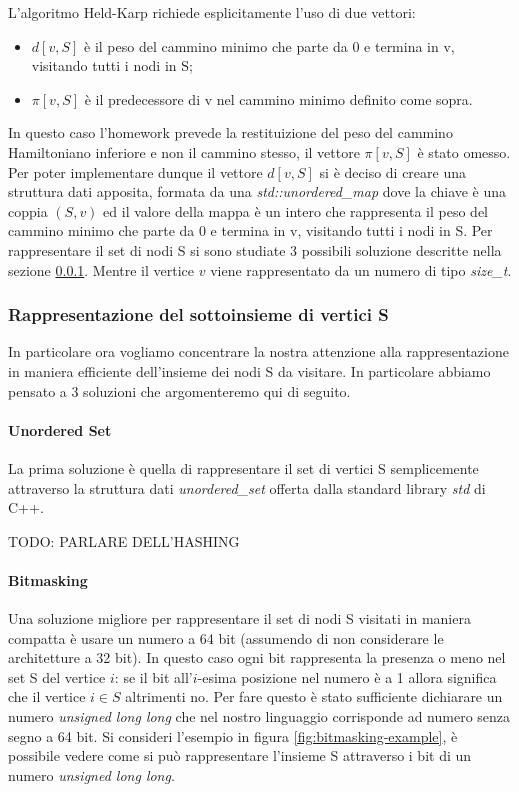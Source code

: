 L'algoritmo Held-Karp richiede esplicitamente l'uso di due vettori:
\begin{itemize}
    \item $d[v,S]$ è il peso del cammino minimo che parte da 0 e termina in v, visitando tutti i nodi in S;
    \item $\pi[v,S]$ è il predecessore di v nel cammino minimo definito come sopra.
\end{itemize}

In questo caso l'homework prevede la restituizione del peso del cammino Hamiltoniano inferiore e non il cammino stesso, il vettore $\pi[v,S]$ è stato omesso. Per poter implementare dunque il vettore $d[v,S]$ si è deciso di creare una struttura dati apposita, formata da una \textit{std::unordered\_map} dove la chiave è una coppia $(S, v)$ ed il valore della mappa è un intero che rappresenta il peso del cammino minimo che parte da 0 e termina in v, visitando tutti i nodi in S. Per rappresentare il set di nodi S si sono studiate 3 possibili soluzione descritte nella sezione \ref{cap:S-repr}. Mentre il vertice $v$ viene rappresentato da un numero di tipo \textit{size\_t}.

\subsubsection{Rappresentazione del sottoinsieme di vertici S}
\label{cap:S-repr}
In particolare ora vogliamo concentrare la nostra attenzione alla rappresentazione in maniera efficiente dell'insieme dei nodi S da visitare. In particolare abbiamo pensato a 3 soluzioni che argomenteremo qui di seguito.

\paragraph{Unordered Set}
La prima soluzione è quella di rappresentare il set di vertici S semplicemente attraverso la struttura dati \textit{unordered\_set} offerta dalla standard library \textit{std} di C++.  

TODO: PARLARE DELL'HASHING

\paragraph{Bitmasking}

\noindent Una soluzione migliore per rappresentare il set di nodi S visitati in maniera compatta è usare un numero a 64 bit (assumendo di non considerare le architetture a 32 bit). In questo caso ogni bit rappresenta la presenza o meno nel set S del vertice $i$: se il bit all'$i$-esima posizione nel numero è a 1 allora significa che il vertice $i \in S$ altrimenti no. Per fare questo è stato sufficiente dichiarare un numero \textit{unsigned long long} che nel nostro linguaggio corrisponde ad numero senza segno a 64 bit. Si consideri l'esempio in figura \ref{fig:bitmasking-example}, è possibile vedere come si può rappresentare l'insieme S attraverso i bit di un numero \textit{unsigned long long}. 

